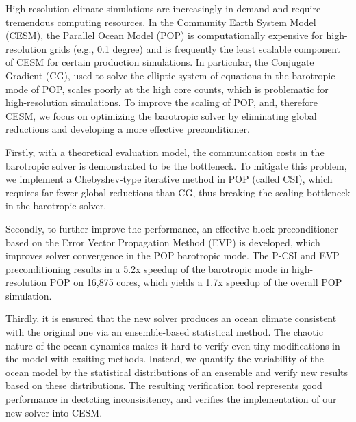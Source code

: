 \begin{eabstract}
  High-resolution climate simulations are increasingly in demand and
  require tremendous computing resources. 
  In the Community Earth System Model (CESM), the Parallel Ocean Model (POP) is
  computationally expensive for high-resolution grids (e.g., 0.1 degree) and is frequently the least scalable component of CESM for certain
  production simulations. 
  In particular, the Conjugate Gradient (CG), used to solve the elliptic system of
  equations in the barotropic mode of POP, scales poorly at the high core counts, which is problematic for high-resolution simulations. 
  To improve the scaling of POP, and, therefore CESM, we focus on optimizing the barotropic solver by eliminating global reductions and developing a more effective preconditioner. 


  Firstly, with a theoretical evaluation model, the communication costs in the
  barotropic solver is demonstrated to be the bottleneck. 
  To mitigate this problem, we implement a Chebyshev-type iterative
  method in POP (called CSI), which requires far fewer global
  reductions than CG, thus breaking the scaling bottleneck in the barotropic solver. 


  Secondly, to further improve the performance, an effective block preconditioner based on the Error Vector Propagation Method (EVP) is developed, which improves solver convergence in the POP barotropic mode.
  The P-CSI and EVP preconditioning results in a 5.2x speedup of
  the barotropic mode in high-resolution POP on 16,875 cores, which
  yields a 1.7x speedup of the overall POP simulation.  

  Thirdly, it is ensured that the new solver produces an ocean climate consistent with the original one via an ensemble-based statistical method. 
  The chaotic nature of the ocean dynamics makes it hard to verify even tiny modifications in the model with exsiting methods.
  Instead, we quantify the variability of the ocean model by the statistical distributions of an ensemble and verify new results based on these distributions. 
  The resulting verification tool represents good performance in dectcting inconsisitency, and verifies the implementation of our new solver into CESM. 



\end{eabstract}

